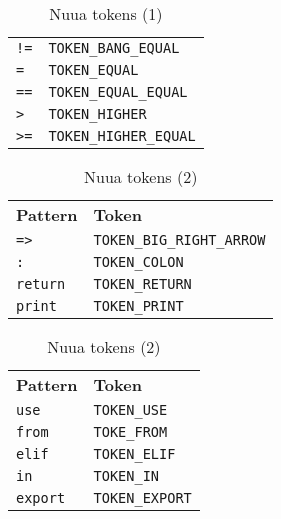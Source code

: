 \begin{table}[H]
\begin{subtable}{0.45\textwidth}
\begin{tabular}{ l l }
            \texttt{!=} & \texttt{TOKEN\_BANG\_EQUAL} \\
            \texttt{=} & \texttt{TOKEN\_EQUAL} \\
            \texttt{==} & \texttt{TOKEN\_EQUAL\_EQUAL} \\
            \texttt{>} & \texttt{TOKEN\_HIGHER} \\
            \texttt{>=} & \texttt{TOKEN\_HIGHER\_EQUAL} \\
		\end{tabular}
		\caption{}
	\end{subtable}
	\caption{Nuua tokens (1)}
    \label{fig:nuua_tokens_1}
\end{table}

\begin{table}[H]
	\centering
	\begin{subtable}{0.45\textwidth}
		\centering
        \begin{tabular}{ l l }
            \textbf{Pattern} & \textbf{Token} \\
            \texttt{=>} & \texttt{TOKEN\_BIG\_RIGHT\_ARROW} \\
            \texttt{:} & \texttt{TOKEN\_COLON} \\
            \texttt{return} & \texttt{TOKEN\_RETURN} \\
            \texttt{print} & \texttt{TOKEN\_PRINT} \\
		\end{tabular}
		\caption{}
	\end{subtable}
	\begin{subtable}{0.45\textwidth}
		\centering
        \begin{tabular}{ l l }
            \textbf{Pattern} & \textbf{Token} \\
            \texttt{use} & \texttt{TOKEN\_USE} \\
            \texttt{from} & \texttt{TOKE\_FROM} \\
            \texttt{elif} & \texttt{TOKEN\_ELIF} \\
            \texttt{in} & \texttt{TOKEN\_IN} \\
            \texttt{export} & \texttt{TOKEN\_EXPORT} \\
		\end{tabular}
		\caption{}
	\end{subtable}
	\caption{Nuua tokens (2)}
    \label{fig:nuua_tokens_2}
\end{table}

